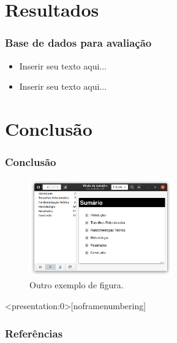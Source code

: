 \documentclass[aspectratio=34, 14pt]{latex-slides}
\begin{document}
\section{Resultados}
\begin{frame}
    \frametitle{Base de dados para avaliação}

    \begin{itemize}
        \item Inserir seu texto aqui...
        \item Inserir seu texto aqui...
    \end{itemize}
\end{frame}

\section{Conclusão}
\begin{frame}
    \frametitle{Conclusão}

    \setcounter{figure}{3}
    \begin{figure}[!t]
        \centering
        \includegraphics[width=0.55\textwidth]{./figuras/figura-exemplo2}
        \caption{Outro exemplo de figura.}
        \label{fig:outro_exemplo_figura}
    \end{figure}
\end{frame}

\begin{frame}<presentation:0>[noframenumbering] %
    \frametitle{Referências}

    \small
    
\end{frame}

\begin{frame}
    \titlepage
\end{frame}
\end{document}
